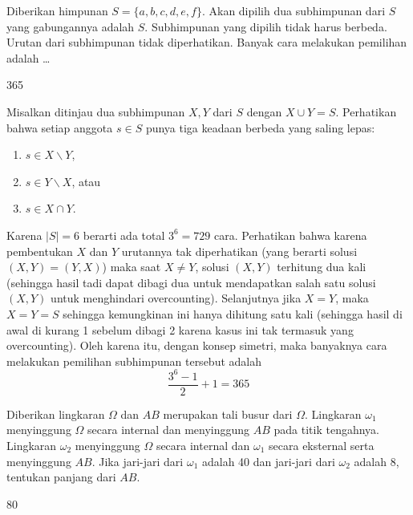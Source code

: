 \documentclass[12pt]{scrartcl}
\begin{document}
\begin{soalbaru}
Diberikan himpunan $S = \{a,b,c,d,e,f\}$. Akan dipilih dua subhimpunan dari $S$ yang gabungannya adalah $S$. Subhimpunan yang dipilih tidak harus berbeda. Urutan dari subhimpunan tidak diperhatikan. Banyak cara melakukan pemilihan adalah \dots
\end{soalbaru}
\begin{jawaban}
365
\end{jawaban}
\begin{solusi}
Misalkan ditinjau dua subhimpunan $X,Y$ dari $S$ dengan $X \cup Y = S$. Perhatikan bahwa setiap anggota $s \in S$ punya tiga keadaan berbeda yang saling lepas: 
\begin{enumerate}[1)]
\item $s \in X \backslash Y$,
\item $s \in Y \backslash X$, atau
\item $s \in  X \cap Y$. 
\end{enumerate}
Karena $|S| = 6$ berarti ada total $3^6 = 729$ cara. Perhatikan bahwa karena pembentukan $X$ dan $Y$ urutannya tak diperhatikan (yang berarti solusi $(X,Y)=(Y,X)$) maka saat $X \neq Y$, solusi $(X,Y)$ terhitung dua kali (sehingga hasil tadi dapat dibagi dua untuk mendapatkan salah satu solusi $(X,Y)$ untuk menghindari overcounting). Selanjutnya jika $X=Y$, maka $X=Y=S$ sehingga kemungkinan ini hanya dihitung satu kali (sehingga hasil di awal di kurang 1 sebelum dibagi 2 karena kasus ini tak termasuk yang overcounting). Oleh karena itu, dengan konsep simetri, maka banyaknya cara melakukan pemilihan subhimpunan tersebut adalah
$$\dfrac{3^6-1}{2}+1 = \boxed{365}$$
\end{solusi}

\begin{soalbaru}
Diberikan lingkaran $\Omega$ dan $AB$ merupakan tali busur dari $\Omega$. Lingkaran $\omega_1$ menyinggung $\Omega$ secara internal dan menyinggung $AB$ pada titik tengahnya. Lingkaran $\omega_2$ menyinggung $\Omega$ secara internal dan $\omega_1$ secara eksternal serta menyinggung $AB$. Jika jari-jari dari $\omega_1$ adalah 40 dan jari-jari dari $\omega_2$ adalah 8, tentukan panjang dari $AB$.
\begin{center}
\end{center}
\end{soalbaru}
\begin{jawaban}
80
\end{jawaban}
\end{document}
